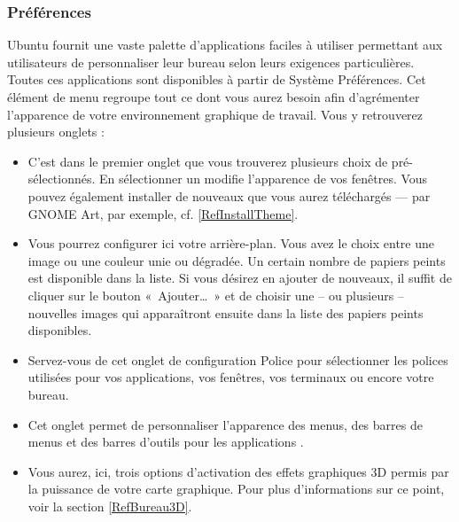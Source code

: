 \subsubsection{Préférences}
Ubuntu fournit une vaste palette d'applications faciles à utiliser permettant aux utilisateurs de personnaliser leur bureau selon leurs exigences particulières. Toutes ces applications sont disponibles à partir de Système \FlecheDroite Préférences. 
Cet élément de menu regroupe tout ce dont vous aurez besoin afin d'agrémenter l'apparence de votre environnement graphique de travail. Vous y retrouverez plusieurs onglets :
\begin{itemize}
\item C'est dans le premier onglet que vous trouverez plusieurs choix de  pré-sélectionnés. En sélectionner un modifie l'apparence de vos fenêtres. Vous pouvez également installer de nouveaux  que vous aurez téléchargés --- par GNOME Art, par exemple, cf. \ref{RefInstallTheme}.
\item Vous pourrez configurer ici votre arrière-plan. Vous avez le choix entre une image ou une couleur unie ou dégradée. Un certain nombre de papiers peints est disponible dans la liste. Si vous désirez en ajouter de nouveaux, il suffit de cliquer sur le bouton «~Ajouter\ldots{}~» et de choisir une -- ou plusieurs -- nouvelles images qui apparaîtront ensuite dans la liste des papiers peints disponibles.
\item Servez-vous de cet onglet de configuration Police pour sélectionner les polices utilisées pour vos applications, vos fenêtres, vos terminaux ou encore votre bureau. 
\item Cet onglet permet de personnaliser l'apparence des menus, des barres de menus et des barres d'outils pour les applications . 
\item Vous aurez, ici, trois options d'activation des effets graphiques 3D permis par la puissance de votre carte graphique. Pour plus d'informations sur ce point, voir la section \ref{RefBureau3D}.
\end{itemize}
